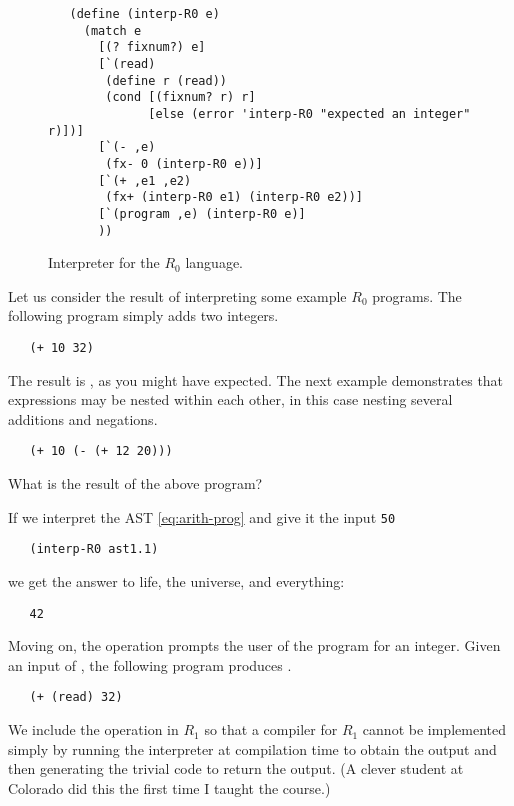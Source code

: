 \documentclass[11pt]{book}
\begin{document}
\begin{figure}[tbp]
\begin{lstlisting}
   (define (interp-R0 e)
     (match e
       [(? fixnum?) e]
       [`(read)
        (define r (read))
        (cond [(fixnum? r) r]
              [else (error 'interp-R0 "expected an integer" r)])]
       [`(- ,e)
        (fx- 0 (interp-R0 e))]
       [`(+ ,e1 ,e2)
        (fx+ (interp-R0 e1) (interp-R0 e2))]
       [`(program ,e) (interp-R0 e)]
       ))
\end{lstlisting}
\caption{Interpreter for the $R_0$ language.}
\label{fig:interp-R0}
\end{figure}

Let us consider the result of interpreting some example $R_0$
programs. The following program simply adds two integers.
\begin{lstlisting}
   (+ 10 32)
\end{lstlisting}
The result is , as you might have expected. 
%
The next example demonstrates that expressions may be nested within
each other, in this case nesting several additions and negations.
\begin{lstlisting}
   (+ 10 (- (+ 12 20)))
\end{lstlisting}
What is the result of the above program?

If we interpret the AST \eqref{eq:arith-prog} and give it the input
\texttt{50}
\begin{lstlisting}
   (interp-R0 ast1.1)
\end{lstlisting}
we get the answer to life, the universe, and everything:
\begin{lstlisting}
   42
\end{lstlisting}

Moving on, the  operation prompts the user of the program
for an integer. Given an input of , the following program
produces .
\begin{lstlisting}
   (+ (read) 32)
\end{lstlisting}
We include the  operation in $R_1$ so that a compiler for
$R_1$ cannot be implemented simply by running the interpreter at
compilation time to obtain the output and then generating the trivial
code to return the output. (A clever student at Colorado did this the
first time I taught the course.)

\end{document}
